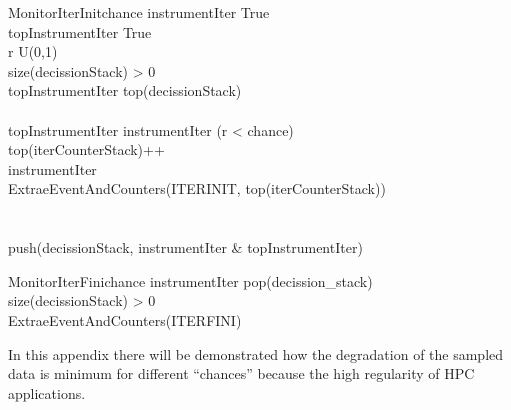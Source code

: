 \begin{pseudocode}{MonitorIterInit}{chance}
\label{pc:mercurium_monitor_iter_init}
    instrumentIter \GETS True\\
    topInstrumentIter \GETS True\\
    r \in U(0,1)\\
    \IF size(decissionStack) > 0 \THEN
    \BEGIN
      \\
      topInstrumentIter \GETS top(decissionStack)\\
    \END\\
    \IF topInstrumentIter \THEN
    \BEGIN
        instrumentIter \GETS (r < chance)\\
        top(iterCounterStack)++\\
        \IF instrumentIter \THEN
        \BEGIN
            \\
            ExtraeEventAndCounters(ITERINIT, top(iterCounterStack))\\
        \END\\
    \END\\
    push(decissionStack, instrumentIter \&  topInstrumentIter)\\
\end{pseudocode}

\begin{pseudocode}{MonitorIterFini}{chance}
\label{pc:mercurium_monitor_iter_fini}
    instrumentIter \GETS pop(decission_stack)\\
    \IF size(decissionStack) > 0 \THEN
    \BEGIN
      \\
      ExtraeEventAndCounters(ITERFINI)
    \END\\
\end{pseudocode}


In this appendix there will be demonstrated how the degradation of the sampled
data is minimum for different ``chances'' because the high regularity of HPC
applications.
